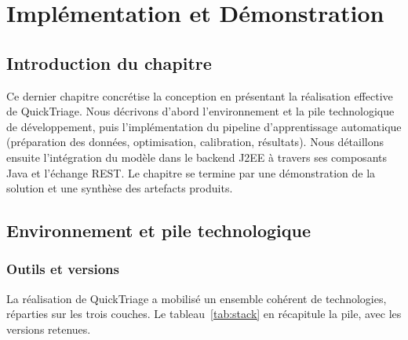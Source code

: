 \chapter{Implémentation et Démonstration}

\section*{Introduction du chapitre}
Ce dernier chapitre concrétise la conception en présentant la réalisation effective de
QuickTriage. Nous décrivons d'abord l'environnement et la pile technologique de développement,
puis l'implémentation du pipeline d'apprentissage automatique (préparation des données,
optimisation, calibration, résultats). Nous détaillons ensuite l'intégration du modèle dans le
backend J2EE à travers ses composants Java et l'échange REST. Le chapitre se termine par une
démonstration de la solution et une synthèse des artefacts produits.

\section{Environnement et pile technologique}

\subsection{Outils et versions}
La réalisation de QuickTriage a mobilisé un ensemble cohérent de technologies, réparties sur les
trois couches. Le tableau~\ref{tab:stack} en récapitule la pile, avec les versions retenues.

